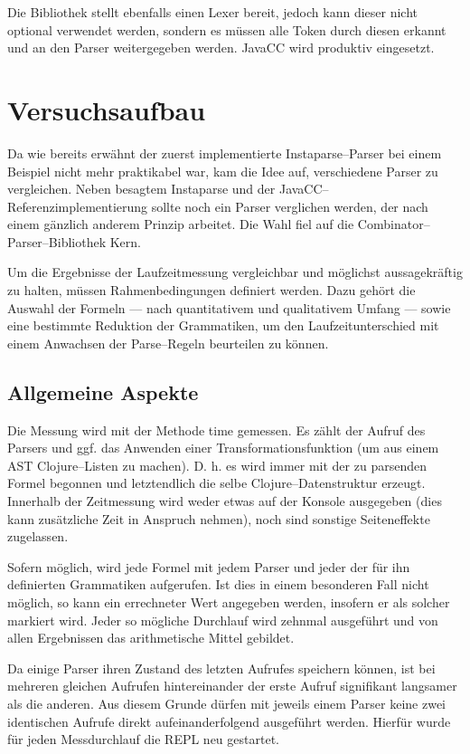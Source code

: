 \documentclass[ngerman,a4paper,abstracton,open=right,twoside=false,toc=listofnumbered,bibtotocnumbered]{scrreprt}
\begin{document}
Die Bibliothek stellt ebenfalls einen Lexer bereit, jedoch kann dieser nicht optional verwendet werden, sondern es müssen alle Token durch diesen erkannt und an den Parser weitergegeben werden. JavaCC wird produktiv eingesetzt.

\chapter{Versuchsaufbau}

Da wie bereits erwähnt der zuerst implementierte Instaparse--Parser bei einem Beispiel nicht mehr praktikabel war, kam die Idee auf, verschiedene Parser zu vergleichen. Neben besagtem Instaparse und der JavaCC--Referenzimplementierung sollte noch ein Parser verglichen werden, der nach einem gänzlich anderem Prinzip arbeitet. Die Wahl fiel auf die Combinator--Parser--Bibliothek Kern.

Um die Ergebnisse der Laufzeitmessung vergleichbar und möglichst aussagekräftig zu halten, müssen Rahmenbedingungen definiert werden. Dazu gehört die Auswahl der Formeln --- nach quantitativem und qualitativem Umfang --- sowie eine bestimmte Reduktion der Grammatiken, um den Laufzeitunterschied mit einem Anwachsen der Parse--Regeln beurteilen zu können.

\section{Allgemeine Aspekte}

Die Messung wird mit der Methode \glqq{}time\grqq{} gemessen. Es zählt der Aufruf des Parsers und ggf. das Anwenden einer Transformationsfunktion (um aus einem AST Clojure--Listen zu machen). D. h. es wird immer mit der zu parsenden Formel begonnen und letztendlich die selbe Clojure--Datenstruktur erzeugt. Innerhalb der Zeitmessung wird weder etwas auf der Konsole ausgegeben (dies kann zusätzliche Zeit in Anspruch nehmen), noch sind sonstige Seiteneffekte zugelassen.

Sofern möglich, wird jede Formel mit jedem Parser und jeder der für ihn definierten Grammatiken aufgerufen. Ist dies in einem besonderen Fall nicht möglich, so kann ein errechneter Wert angegeben werden, insofern er als solcher markiert wird. Jeder so mögliche Durchlauf wird zehnmal ausgeführt und von allen Ergebnissen das arithmetische Mittel gebildet.

Da einige Parser ihren Zustand des letzten Aufrufes speichern können, ist bei mehreren gleichen Aufrufen hintereinander der erste Aufruf signifikant langsamer als die anderen. Aus diesem Grunde dürfen mit jeweils einem Parser keine zwei identischen Aufrufe direkt aufeinanderfolgend ausgeführt werden. Hierfür wurde für jeden Messdurchlauf die REPL neu gestartet. 
\end{document}
